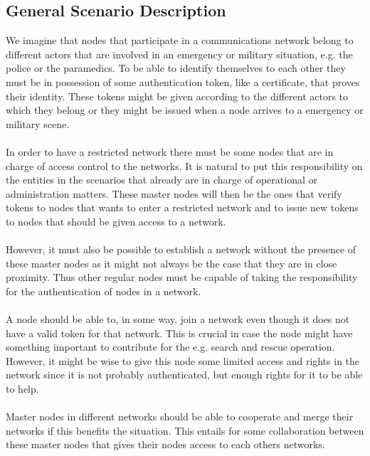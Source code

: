 \subsection{General Scenario Description}
We imagine that nodes that participate in a communications network belong to different actors that are involved in an emergency or military situation, e.g. the police or the paramedics. To be able to identify themselves to each other they must be in possession of some authentication token, like a certificate, that proves their identity. These tokens might be given according to the different actors to which they belong or they might be issued when a node arrives to a emergency or military scene.
\\\\
In order to have a restricted network there must be some nodes that are in charge of access control to the networks. It is natural to put this responsibility on the entities in the scenarios that already are in charge of operational or administration matters. These master nodes will then be the ones that verify tokens to nodes that wants to enter a restricted network and to issue new tokens to nodes that should be given access to a network. 
\\\\
However, it must also be possible to establish a network without the presence of these master nodes as it might not always be the case that they are in close proximity. Thus other regular nodes must be capable of taking the responsibility for the authentication of nodes in a network.
\\\\
A node should be able to, in some way, join a network even though it does not have a valid token for that network. This is crucial in case the node might have something important to contribute for the e.g. search and rescue operation. However, it might be wise to give this node some limited access and rights in the network since it is not probably authenticated, but enough rights for it to be able to help.
\\\\
Master nodes in different networks should be able to cooperate and merge their networks if this benefits the situation. This entails for some collaboration between these master nodes that gives their nodes access to each others networks.

